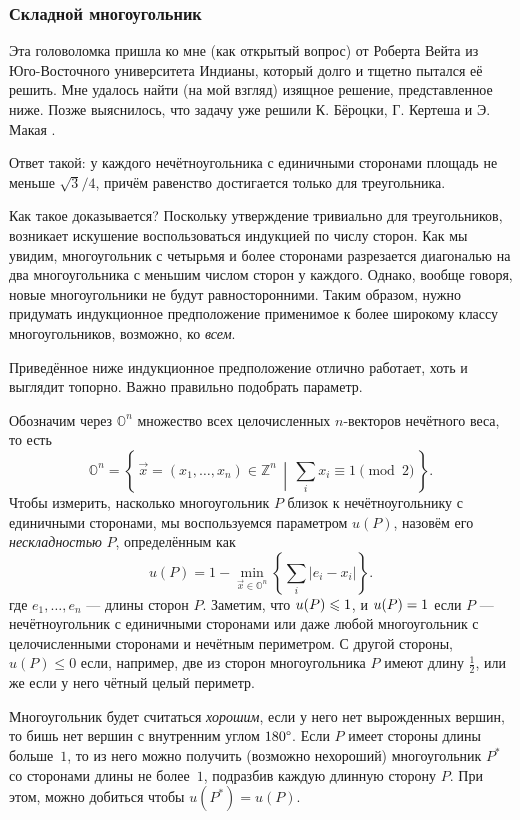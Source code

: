 \subsubsection*{Складной многоугольник}

Эта головоломка пришла ко мне (как открытый вопрос) от Роберта Вейта из Юго-Восточного университета Индианы, который долго и тщетно пытался её решить.
Мне удалось найти (на мой взгляд) изящное решение, представленное ниже.
Позже выяснилось, что задачу уже решили К. Бёроцки, Г. Кертеша и Э. Макая \cite{9}.

Ответ такой: у каждого нечётноугольника с единичными сторонами площадь не меньше $\sqrt{3}/4$, причём равенство достигается только для треугольника.

Как такое доказывается?
Поскольку утверждение тривиально для треугольников, возникает искушение воспользоваться индукцией по числу сторон.
Как мы увидим,  многоугольник с четырьмя и более сторонами разрезается диагональю на два многоугольника с меньшим числом сторон у каждого.
Однако, вообще говоря, новые многоугольники не будут равносторонними.
Таким образом, нужно придумать индукционное предположение применимое к более широкому классу многоугольников, возможно, ко \emph{всем}.

Приведённое ниже индукционное предположение отлично работает, хоть и выглядит топорно. Важно правильно подобрать параметр.

Обозначим через $\mathbb{O}^n$ множество всех целочисленных $n$-векторов нечётного веса, то есть 
\[\mathbb{O}^n=\left\{\,\vec x=(x_1,\dots,x_n)\in \mathbb{Z}^n\,\middle|\, \sum_ix_i\equiv 1\pmod 2\,\right\}.\]
Чтобы измерить, насколько многоугольник $P$ близок к нечётноугольнику с единичными сторонами, мы воспользуемся параметром $u(P)$, назовём его \emph{нескладностью} $P$, определённым как
\[u(P)=1-\min_{\vec x\in \mathbb{O}^n} \left\{\sum_i |e_i-x_i|\right\}.\]
где  $e_1,\dots,e_n$ --- длины сторон $P$.
Заметим, что $u(P)\z\leqslant1$, и $u(P)\z=1$ если $P$ --- нечётноугольник с единичными сторонами или даже любой многоугольник с целочисленными сторонами и нечётным периметром.
С другой стороны, $u(P)\leqslant 0$ если, например, две из сторон многоугольника $P$ имеют длину $\tfrac12$, или же если у него чётный целый периметр.

Многоугольник будет считаться \emph{хорошим}, если у него нет вырожденных вершин, то бишь нет вершин с внутренним углом $180\degree$.
Если $P$ имеет стороны длины больше~$1$, то из него можно получить (возможно нехороший) многоугольник $P^*$ со сторонами длины не более~$1$, подразбив каждую длинную сторону $P$.
При этом, можно добиться чтобы $u(P^*)=u(P)$.

